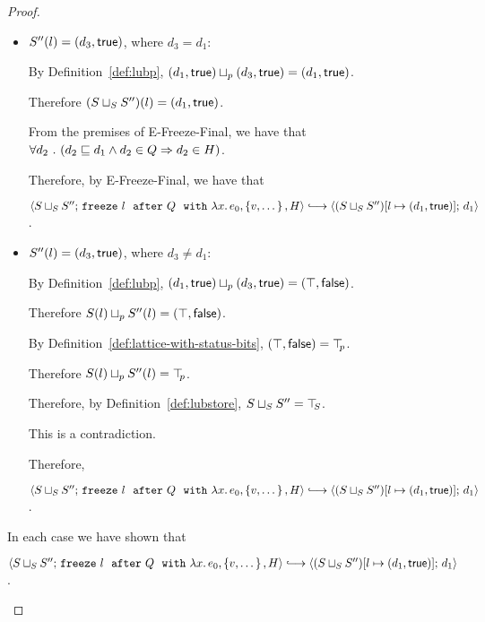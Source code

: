 \begin{proof}
\begin{itemize}
\begin{itemize}
\begin{itemize}
        \item $S''(l) = (d_3, \textsf{true})$, where $d_3 = d_1$:

          By Definition~\ref{def:lubp},
          $(d_1, \textsf{true}) \sqcup_p (d_3, \textsf{true}) =
          (d_1, \textsf{true})$.

          Therefore $(S \sqcup_{S} S'')(l) = (d_1, \textsf{true})$.

          From the premises of {\sc E-Freeze-Final}, we have that
          $\forall{d_2} ~.~ ( {d_2 \sqsubseteq d_1 \land d_2 \in Q} \Rightarrow d_2 \in
          H)$.

          Therefore, by {\sc E-Freeze-Final}, we have that

          $\config{\lubstore{S}{S''}}{\freezeafterfull{l}{Q}{\lam{x}{e_0}}{\setof{v,
                \dots}}{H}} \parstepsto
          \config{\extS{(\lubstore{S}{S''})}{l}{d_1}{\frozentrue}}{d_1}$.

        \item $S''(l) = (d_3, \textsf{true})$, where $d_3 \neq d_1$:

          By Definition~\ref{def:lubp},
          $(d_1, \textsf{true}) \sqcup_p (d_3, \textsf{true})
          = (\top, \textsf{false})$.

          Therefore $S(l) \sqcup_p S''(l) = (\top, \textsf{false})$.

          By Definition~\ref{def:lattice-with-status-bits},
          $(\top, \textsf{false}) = \top\hspace{-0.85mm}_{p}$.

          Therefore $S(l) \sqcup_p S''(l) = \top\hspace{-0.85mm}_{p}$.

          Therefore, by Definition~\ref{def:lubstore},
          $S \sqcup_{S} S'' = \top\hspace{-0.85mm}_{S}$.

          This is a contradiction.

          Therefore,

          $\config{\lubstore{S}{S''}}{\freezeafterfull{l}{Q}{\lam{x}{e_0}}{\setof{v,
                \dots}}{H}} \parstepsto
          \config{\extS{(\lubstore{S}{S''})}{l}{d_1}{\frozentrue}}{d_1}$.
        \end{itemize}
      \end{itemize}

      In each case we have shown that

      $\config{\lubstore{S}{S''}}{\freezeafterfull{l}{Q}{\lam{x}{e_0}}{\setof{v,
            \dots}}{H}} \parstepsto
      \config{\extS{(\lubstore{S}{S''})}{l}{d_1}{\frozentrue}}{d_1}$.


\end{itemize}
\end{proof}
